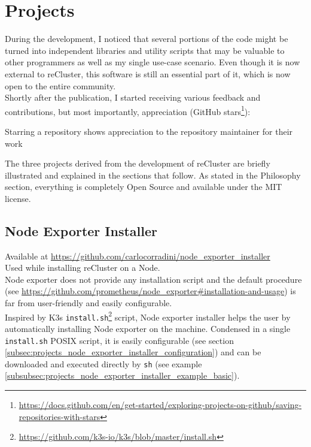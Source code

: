 \chapter{Projects}
\label{cha:projects}

During the development, I noticed that several portions of the code might be
turned into independent libraries and utility scripts that may be valuable to
other programmers as well as my single use-case scenario. Even though it is now external
to reCluster, this software is still an essential part of it, which is now open to
the entire community. \\ %
Shortly after the publication, I started receiving various feedback and
contributions, but most importantly, appreciation (GitHub stars\footnote{\url{https://docs.github.com/en/get-started/exploring-projects-on-github/saving-repositories-with-stars}}):
\begin{displayquote}
  Starring a repository shows appreciation to the repository maintainer for their
  work\cite{github_stars}
\end{displayquote}
The three projects derived from the development of reCluster are briefly illustrated
and explained in the sections that follow. As stated in the Philosophy section, everything
is completely Open Source and available under the MIT license.

\section{Node Exporter Installer}
\label{sec:projects_node_exporter_installer}

Available at \url{https://github.com/carlocorradini/node\_exporter\_installer}
\\ %
Used while installing reCluster on a Node. \\ %
Node exporter does not provide any installation script and the default procedure
(see \url{https://github.com/prometheus/node_exporter#installation-and-usage}) is
far from user-friendly and easily configurable. \\ %
Inspired by K3s \texttt{install.sh}\footnote{\url{https://github.com/k3s-io/k3s/blob/master/install.sh}}
script, Node exporter installer helps the user by automatically installing Node exporter
on the machine. Condensed in a single \texttt{install.sh} POSIX script, it is
easily configurable (see section \ref{subsec:projects_node_exporter_installer_configuration})
and can be downloaded and executed directly by \texttt{sh} (see example
\ref{subsubsec:projects_node_exporter_installer_example_basic}).

